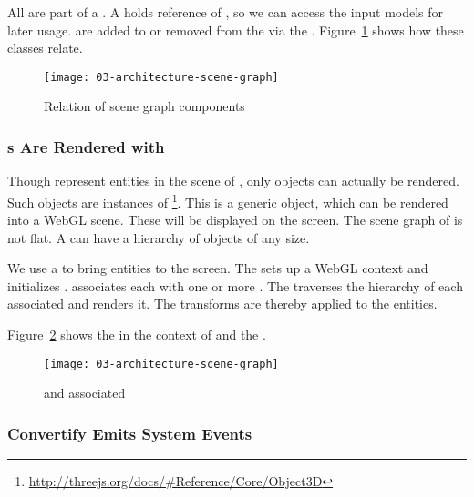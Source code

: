 \documentclass[../ClassicThesis.tex]{subfiles}
\begin{document}
All  are part of a . A
 holds reference of , so we can
access the input models for later usage.  are
added to or removed from the  via the
. Figure~\ref{fig:scene-graph} shows how
these classes relate.

\begin{figure}[h]
  \centering
  \texttt{[image: 03-architecture-scene-graph]}
  \caption{Relation of scene graph components}
  \label{fig:scene-graph}
\end{figure}

\subsubsection{{\threedobject}s Are Rendered with
  {\threejs}}

Though  represent entities in the scene of
{\convertify}, only {\threejs} objects can actually be
rendered. Such {\threejs} objects are instances of
\footnote{\url{http://threejs.org/docs/#Reference/Core/Object3D}}.
This is a generic object, which can be rendered into a WebGL
scene. These  will be displayed on the
screen. The scene graph of {\threejs} is not flat. A
 can have a hierarchy of objects of
any size.

We use a  to bring {\threejs} entities to
the screen. The  sets up a WebGL context and
initializes {\threejs}. {\convertify} associates each
 with one or more . The
 traverses the hierarchy of each associated
 and renders it. The 
transforms are thereby applied to the {\threejs} entities.

Figure~\ref{fig:nodes-and-three} shows the
 in the context of  and
the .

\begin{figure}[h]
  \centering
  \texttt{[image: 03-architecture-scene-graph]}
  \caption{ and associated }
  \label{fig:nodes-and-three}
\end{figure}

\subsubsection{Convertify Emits System Events}
\end{document}
